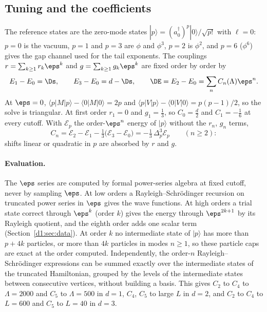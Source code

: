 \subsection{Tuning and the coefficients}\label{sec:tuning}
The reference states are the zero-mode states $|p\rangle=(a_0^\dagger)^p|0\rangle/\sqrt{p!}$ with $\ell=0$: $p=0$ is
the vacuum, $p=1$ and $p=3$ are $\phi$ and $\phi^3$, $p=2$ is $\phi^2$, and $p=6$ ($\phi^6$) gives the gap channel used
for the tail exponents. The couplings $r=\sum_{k\ge1}r_k\eps^k$ and $g=\sum_{k\ge1}g_k\eps^k$ are fixed order by order by
\begin{equation}
 E_1-E_0=\Ds,\qquad E_3-E_0=d-\Ds,\qquad \DE=E_2-E_0=\sum_nC_n(\Lambda)\eps^n .
 \label{eq:tune}
\end{equation}
At $\eps=0$, $\langle p|M|p\rangle-\langle0|M|0\rangle=2p$ and $\langle p|V|p\rangle-\langle0|V|0\rangle=p(p-1)/2$, so
the solve is triangular. At first order $r_1=0$ and $g_1=\tfrac13$, so $C_0=\tfrac d2$ and $C_1=-\tfrac16$ at every
cutoff. With $\mathcal E_p$ the order-$\eps^n$ energy of $|p\rangle$ without the $r_n$, $g_n$ terms,
\begin{equation}
 C_n=\mathcal E_2-\mathcal E_1-\tfrac13\big(\mathcal E_3-\mathcal E_0\big)=-\tfrac13\,\Delta_p^3\mathcal E_p\qquad(n\ge2):
 \label{eq:Pi}
\end{equation}
shifts linear or quadratic in $p$ are absorbed by $r$ and $g$.

\paragraph{Evaluation.} The $\eps$ series are computed by formal power-series algebra at fixed cutoff, never by
sampling $\eps$. At low orders a Rayleigh--Schr\"odinger recursion on truncated power series in $\eps$ gives the wave
functions. At high orders a trial state correct through $\eps^k$ (order $k$) gives the energy through $\eps^{2k+1}$ by
its Rayleigh quotient, and the eighth order adds one scalar term (Section~\ref{d1:sec:data}). At order $k$ no
intermediate state of $|p\rangle$ has more than $p+4k$ particles, or more than $4k$ particles in modes $n\ge1$, so these
particle caps are exact at the order computed. Independently, the order-$n$ Rayleigh--Schr\"odinger expressions can be
summed exactly over the intermediate states of the truncated Hamiltonian, grouped by the levels of the intermediate
states between consecutive vertices, without building a basis. This gives $C_2$ to $C_4$ to $\Lambda=2000$ and $C_5$ to
$\Lambda=500$ in $d=1$, $C_4$, $C_5$ to large $L$ in $d=2$, and $C_2$ to $C_4$ to $L=600$ and $C_5$ to $L=40$ in $d=3$.

